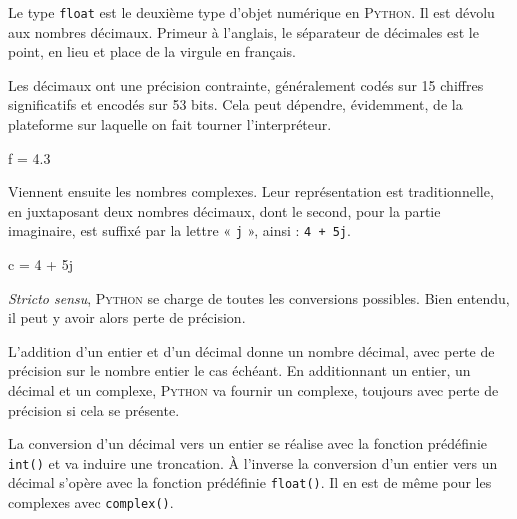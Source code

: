
Le type \texttt{float} est le deuxième type d'objet numérique en \textsc{Python}. Il est dévolu aux nombres décimaux. Primeur à l'anglais, le séparateur de décimales est le point, en lieu et place de la virgule en français.

Les décimaux ont une précision contrainte, généralement codés sur 15 chiffres significatifs et encodés sur 53 bits. Cela peut dépendre, évidemment, de la plateforme sur laquelle on fait tourner l'interpréteur.

\begin{idleconsole}
	\begin{pyconsole}
		f = 4.3
	\end{pyconsole}
\end{idleconsole}

\vspace{2pt}


Viennent ensuite les nombres complexes. Leur représentation est traditionnelle, en juxtaposant deux nombres décimaux, dont le second, pour la partie imaginaire, est suffixé par la lettre « \texttt{j} », ainsi : \texttt{4 + 5j}.

\begin{idleconsole}
	\begin{pyconsole}
		c = 4 + 5j
	\end{pyconsole}
\end{idleconsole}

\vspace{2pt}


\textit{Stricto sensu}, \textsc{Python} se charge de toutes les conversions possibles. Bien entendu, il peut y avoir alors perte de précision.

L'addition d'un entier et d'un décimal donne un nombre décimal, avec perte de précision sur le nombre entier le cas échéant. En additionnant un entier, un décimal et un complexe, \textsc{Python} va fournir un complexe, toujours avec perte de précision si cela se présente.

La conversion d'un décimal vers un entier se réalise avec la fonction prédéfinie \texttt{int()} et va induire une troncation. À l'inverse la conversion d'un entier vers un décimal s'opère avec la fonction prédéfinie \texttt{float()}. Il en est de même pour les complexes avec \texttt{complex()}.

